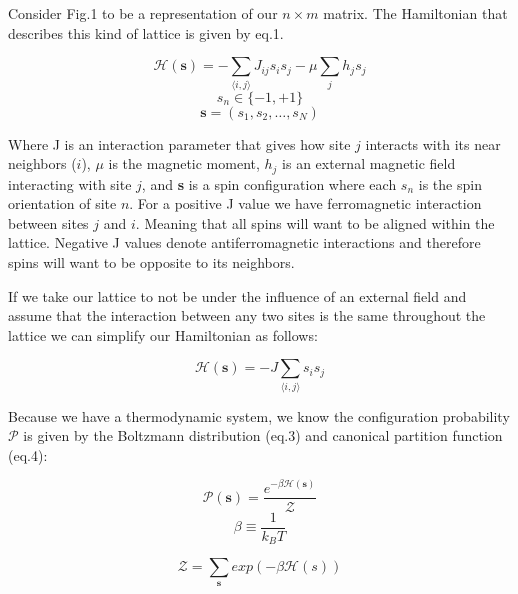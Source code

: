 \documentclass[a4]{scrartcl}
\begin{document}
Consider Fig.1 to be a representation of our $ n \times m $ matrix. The Hamiltonian that describes this kind of lattice is given by eq.1. 

\begin{equation}
\mathcal{H}(\textbf{s}) = - \sum_{\langle i, j \rangle} J_{ij} s_{i} s_{j} -
	\mu \sum_{j} h_j s_j
\end{equation}
{\scriptsize \begin{equation*}
s_{n} \in \{-1,+1\}
\end{equation*}}\vspace{-.5cm}
\begin{equation*}
\textbf{s} = (s_{1}, s_{2}, \dots, s_{N})
\end{equation*}
 
Where J is an interaction parameter that gives how site $ j $ interacts with its near neighbors ($ i $), $\mu$ is the magnetic moment, $h_j$ is an external magnetic field interacting with site $ j $, and \textbf{s} is a spin configuration where each $s_n$ is the spin orientation of site $n$. For a positive J value we have ferromagnetic interaction between sites $ j $ and $ i $. Meaning that all spins will want to be aligned within the lattice. Negative J values denote antiferromagnetic interactions and therefore spins will want to be opposite to its neighbors. 

If we take our lattice to not be under the influence of an external field and assume that the interaction between any two sites is the same throughout the lattice we can simplify our Hamiltonian as follows:
 
\begin{equation}
\mathcal{H}(\textbf{s}) = -J \sum_{\langle i, j \rangle} s_{i} s_{j}
\end{equation}

Because we have a thermodynamic system, we know the configuration probability $ \mathcal{P} $ is given by the Boltzmann distribution (eq.3) and canonical partition function (eq.4):

\begin{equation}
	\mathcal{P}(\textbf{s}) = \frac{e^{-\beta \mathcal{H}(\textbf{s})}}
		{\mathcal{Z}}
\end{equation}
{\scriptsize \begin{equation*}
	\beta \equiv \frac{1}{k_{B} T}
\end{equation*}}

\begin{equation}
\mathcal{Z} = \sum_{\textbf{s}} exp(-\beta \mathcal{H}(s))
\end{equation}
\end{document}
